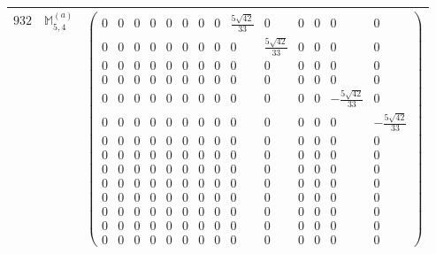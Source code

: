 \documentclass[fleqn,8pt,landscape]{jsarticle}
\begin{document}
\begin{center}
\begin{longtable}{ccc}
$ 932 $ & $ \mathbb{M}_{5,4}^{(a)} $ & $ \begin{pmatrix} 0 & 0 & 0 & 0 & 0 & 0 & 0 & 0 & \frac{5 \sqrt{42}}{33} & 0 & 0 & 0 & 0 & 0 \\ 0 & 0 & 0 & 0 & 0 & 0 & 0 & 0 & 0 & \frac{5 \sqrt{42}}{33} & 0 & 0 & 0 & 0 \\ 0 & 0 & 0 & 0 & 0 & 0 & 0 & 0 & 0 & 0 & 0 & 0 & 0 & 0 \\ 0 & 0 & 0 & 0 & 0 & 0 & 0 & 0 & 0 & 0 & 0 & 0 & 0 & 0 \\ 0 & 0 & 0 & 0 & 0 & 0 & 0 & 0 & 0 & 0 & 0 & 0 & - \frac{5 \sqrt{42}}{33} & 0 \\ 0 & 0 & 0 & 0 & 0 & 0 & 0 & 0 & 0 & 0 & 0 & 0 & 0 & - \frac{5 \sqrt{42}}{33} \\ 0 & 0 & 0 & 0 & 0 & 0 & 0 & 0 & 0 & 0 & 0 & 0 & 0 & 0 \\ 0 & 0 & 0 & 0 & 0 & 0 & 0 & 0 & 0 & 0 & 0 & 0 & 0 & 0 \\ 0 & 0 & 0 & 0 & 0 & 0 & 0 & 0 & 0 & 0 & 0 & 0 & 0 & 0 \\ 0 & 0 & 0 & 0 & 0 & 0 & 0 & 0 & 0 & 0 & 0 & 0 & 0 & 0 \\ 0 & 0 & 0 & 0 & 0 & 0 & 0 & 0 & 0 & 0 & 0 & 0 & 0 & 0 \\ 0 & 0 & 0 & 0 & 0 & 0 & 0 & 0 & 0 & 0 & 0 & 0 & 0 & 0 \\ 0 & 0 & 0 & 0 & 0 & 0 & 0 & 0 & 0 & 0 & 0 & 0 & 0 & 0 \\ 0 & 0 & 0 & 0 & 0 & 0 & 0 & 0 & 0 & 0 & 0 & 0 & 0 & 0 \end{pmatrix} $ \\ \hline

\end{longtable}
\end{center}
\end{document}
